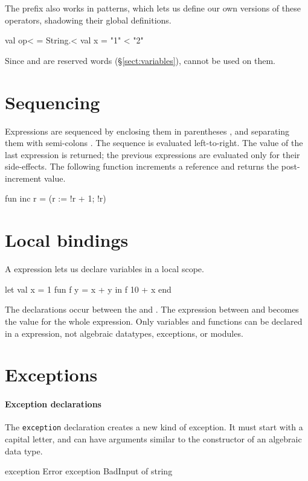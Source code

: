 \documentclass[12pt,a4paper]{book}
\begin{document}
The  prefix also works in patterns, which lets us define our own
versions of these operators, shadowing their global definitions.
\begin{smlcode}
val op< = String.<
val x = "1" < "2"
\end{smlcode}

Since  and  are reserved words
(\S\ref{sect:variables}),  cannot be used on them.

\section{Sequencing}

Expressions are sequenced by enclosing them in parentheses \smlinline{(}
\smlinline{)}, and separating them with semi-colons \smlinline{;}. The sequence
is evaluated left-to-right. The value of the last expression is returned; the
previous expressions are evaluated only for their side-effects.
The following function increments a reference and returns the post-increment value.
\begin{smlcode}
fun inc r =
  (r := !r + 1; !r)
\end{smlcode}


\section{Local bindings}

A  expression lets us declare variables in a local scope.
\begin{smlcode}
let
  val x = 1
  fun f y = x + y
in
  f 10 + x
end
\end{smlcode}
The declarations occur between the  and .
The expression between  and  becomes the value
for the whole  expression. Only variables and functions can be
declared in a  expression, not algebraic datatypes, exceptions,
or modules.

\section{Exceptions}
\label{sect:exceptions}

\paragraph{Exception declarations}
The \texttt{exception} declaration creates a new kind of exception. It must
start with a capital letter, and can have arguments similar to the constructor
of an algebraic data type.
\begin{smlcode}
exception Error
exception BadInput of string
\end{smlcode}
\end{document}
